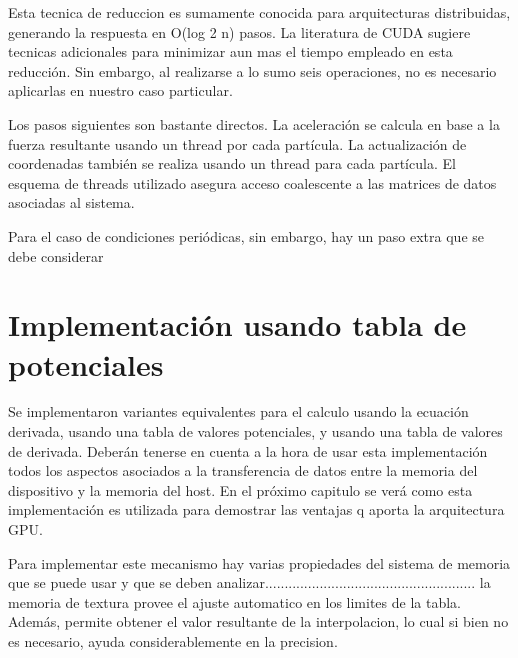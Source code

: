 Esta tecnica de reduccion es sumamente conocida para arquitecturas distribuidas, generando la respuesta en O(log 2 n) pasos. La literatura de CUDA sugiere tecnicas adicionales para minimizar aun mas el tiempo empleado en esta reducción. 
Sin embargo, al realizarse a lo sumo seis operaciones, no es necesario aplicarlas en nuestro caso particular.


Los pasos siguientes son bastante directos. La aceleración se calcula en base a la fuerza resultante usando un thread por cada partícula.
La actualización de coordenadas también se realiza usando un thread para cada partícula. El esquema de threads utilizado asegura acceso coalescente a las matrices de datos asociadas al sistema.

Para el caso de condiciones periódicas, sin embargo, hay un paso extra que se debe considerar


\section{Implementación usando tabla de potenciales}


Se implementaron variantes equivalentes para el calculo usando la ecuación derivada, usando una tabla de valores potenciales, y usando una tabla de valores de derivada.
Deberán tenerse en cuenta a la hora de usar esta implementación todos los aspectos asociados a la transferencia de datos entre la memoria del dispositivo y la memoria del host. En el próximo capitulo se verá como esta implementación es utilizada para demostrar las ventajas q aporta la arquitectura GPU.


Para implementar este mecanismo hay varias propiedades del sistema de memoria que se puede usar y que se deben analizar......................................................
la memoria de textura provee el ajuste automatico en los limites de la tabla. Además, permite obtener el valor resultante de la interpolacion, lo cual si bien no es necesario, ayuda considerablemente en la precision.



